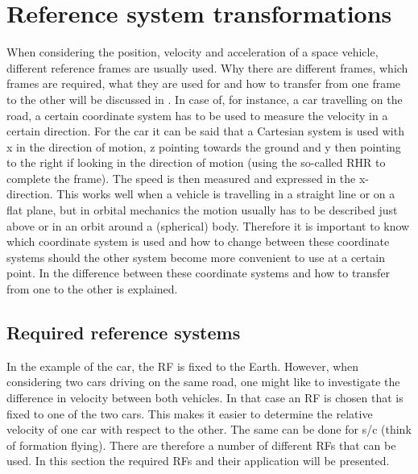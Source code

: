\chapter{Reference system transformations}
\label{app:appendixAA-referenceSystemTransformations}
When considering the position, velocity and acceleration of a space vehicle, different reference frames are usually used. Why there are different frames, which frames are required, what they are used for and how to transfer from one frame to the other will be discussed in . In case of, for instance, a car travelling on the road, a certain coordinate system has to be used to measure the velocity in a certain direction. For the car it can be said that a Cartesian system is used with x in the direction of motion, z pointing towards the ground and y then pointing to the right if looking in the direction of motion (using the so-called \ac{RHR} to complete the frame). The speed is then measured and expressed in the x-direction. This works well when a vehicle is travelling in a straight line or on a flat plane, but in orbital mechanics the motion usually has to be described just above or in an orbit around a (spherical) body. Therefore it is important to know which coordinate system is used and how to change between these coordinate systems should the other system become more convenient to use at a certain point. In  the difference between these coordinate systems and how to transfer from one to the other is explained. 


\section{Required reference systems}
\label{sec:reqrefsys}
In the example of the car, the \acf{RF} is fixed to the Earth. However, when considering two cars driving on the same road, one might like to investigate the difference in velocity between both vehicles. In that case an \ac{RF} is chosen that is fixed to one of the two cars. This makes it easier to determine the relative velocity of one car with respect to the other. The same can be done for \ac{s/c} (think of formation flying). There are therefore a number of different \ac{RF}s that can be used. In this section the required \ac{RF}s and their application will be presented.



